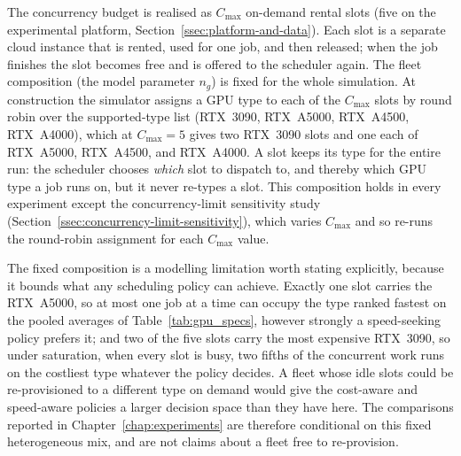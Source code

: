 The concurrency budget is realised as $C_{\max}$ on-demand rental slots (five on the experimental platform, Section~\ref{ssec:platform-and-data}). Each slot is a separate cloud instance that is rented, used for one job, and then released; when the job finishes the slot becomes free and is offered to the scheduler again. The fleet composition (the model parameter $n_g$) is fixed for the whole simulation. At construction the simulator assigns a GPU type to each of the $C_{\max}$ slots by round robin over the supported-type list (RTX~3090, RTX~A5000, RTX~A4500, RTX~A4000), which at $C_{\max}=5$ gives two RTX~3090 slots and one each of RTX~A5000, RTX~A4500, and RTX~A4000. A slot keeps its type for the entire run: the scheduler chooses \emph{which} slot to dispatch to, and thereby which GPU type a job runs on, but it never re-types a slot. This composition holds in every experiment except the concurrency-limit sensitivity study (Section~\ref{ssec:concurrency-limit-sensitivity}), which varies $C_{\max}$ and so re-runs the round-robin assignment for each $C_{\max}$ value.

The fixed composition is a modelling limitation worth stating explicitly, because it bounds what any scheduling policy can achieve. Exactly one slot carries the RTX~A5000, so at most one job at a time can occupy the type ranked fastest on the pooled averages of Table~\ref{tab:gpu_specs}, however strongly a speed-seeking policy prefers it; and two of the five slots carry the most expensive RTX~3090, so under saturation, when every slot is busy, two fifths of the concurrent work runs on the costliest type whatever the policy decides. A fleet whose idle slots could be re-provisioned to a different type on demand would give the cost-aware and speed-aware policies a larger decision space than they have here. The comparisons reported in Chapter~\ref{chap:experiments} are therefore conditional on this fixed heterogeneous mix, and are not claims about a fleet free to re-provision.

